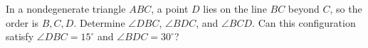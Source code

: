In a nondegenerate triangle $ABC$, a point $D$ lies on the line $BC$ beyond $C$, so the order is $B,C,D$. Determine $\angle DBC$, $\angle BDC$, and $\angle BCD$. Can this configuration satisfy $\angle DBC=15^\circ$ and $\angle BDC=30^\circ$?
